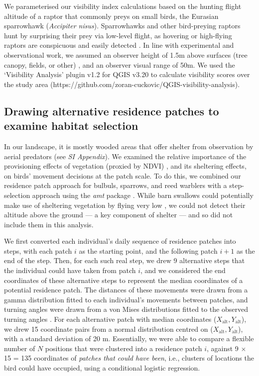 \begin{refsection}
We parameterised our visibility index calculations based on the hunting flight altitude of a raptor that commonly preys on small birds, the Eurasian sparrowhawk (\textit{Accipiter nisus}).
Sparrowhawks and other bird-preying raptors hunt by surprising their prey via low-level flight, as hovering or high-flying raptors are conspicuous and easily detected \cite{krams2001,krams2020}.
In line with experimental and observational work, we assumed an observer height of 1.5m above surfaces (tree canopy, fields, or other) \citep{seress2011,krams2020}, and an observer visual range of 50m.
We used the `Visibility Analysis' plugin v1.2 for QGIS v3.20 to calculate visibility scores over the study area (https://github.com/zoran-cuckovic/QGIS-visibility-analysis).

\subsection*{Drawing alternative residence patches to examine habitat selection}

In our landscape, it is mostly wooded areas that offer shelter from observation by aerial predators (see \textit{SI Appendix}).
We examined the relative importance of the provisioning effects of vegetation (proxied by NDVI) \cite{pettorelli2011}, and its sheltering effects, on birds' movement decisions at the patch scale.
To do this, we combined our residence patch approach for bulbuls, sparrows, and reed warblers with a step-selection approach \citep{thurfjell2014,avgar2016,fieberg2021} using the \textit{amt} package \citep{signer2019}.
While barn swallows could potentially make use of sheltering vegetation by flying very low \cite{warrick2016}, we could not detect their altitude above the ground --- a key component of shelter --- and so did not include them in this analysis.

We first converted each individual's daily sequence of residence patches into steps, with each patch $i$ as the starting point, and the following patch $i+1$ as the end of the step.
Then, for each such real step, we drew 9 alternative steps that the individual could have taken from patch $i$, and we considered the end coordinates of these alternative steps to represent the median coordinates of a potential residence patch.
The distances of these movements were drawn from a gamma distribution fitted to each individual's movements between patches, and turning angles were drawn from a von Mises distributions fitted to the observed turning angles \citep{signer2019}.
For each alternative patch with median coordinates ($X_\text{alt}, Y_\text{alt}$), we drew 15 coordinate pairs from a normal distribution centred on ($X_\text{alt}, Y_\text{alt}$), with a standard deviation of 20 m.
Essentially, we were able to compare a flexible number of $N$ positions that were clustered into a residence patch $i$, against 9 $ \times$ 15 = 135 coordinates of \textit{patches that could have been}, i.e., clusters of locations the bird could have occupied, using a conditional logistic regression.


\end{refsection}
